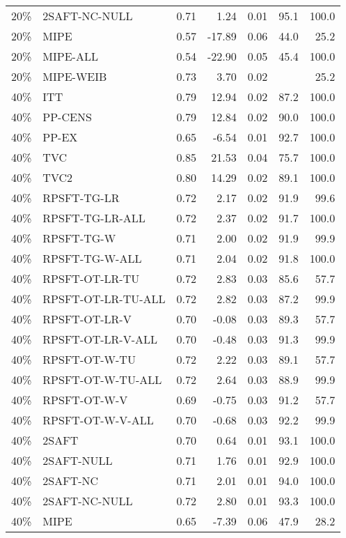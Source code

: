 \begin{table}[ht]
{\begin{tabular}{llrrrrr}
  20\% & 2SAFT-NC-NULL & 0.71 & 1.24 & 0.01 & 95.1 & 100.0 \\ 
  20\% & MIPE & 0.57 & -17.89 & 0.06 & 44.0 & 25.2 \\ 
  20\% & MIPE-ALL & 0.54 & -22.90 & 0.05 & 45.4 & 100.0 \\ 
  20\% & MIPE-WEIB & 0.73 & 3.70 & 0.02 &  & 25.2 \\ 
   \hline
40\% & ITT & 0.79 & 12.94 & 0.02 & 87.2 & 100.0 \\ 
  40\% & PP-CENS & 0.79 & 12.84 & 0.02 & 90.0 & 100.0 \\ 
  40\% & PP-EX & 0.65 & -6.54 & 0.01 & 92.7 & 100.0 \\ 
  40\% & TVC & 0.85 & 21.53 & 0.04 & 75.7 & 100.0 \\ 
  40\% & TVC2 & 0.80 & 14.29 & 0.02 & 89.1 & 100.0 \\ 
   \hline
40\% & RPSFT-TG-LR & 0.72 & 2.17 & 0.02 & 91.9 & 99.6 \\ 
  40\% & RPSFT-TG-LR-ALL & 0.72 & 2.37 & 0.02 & 91.7 & 100.0 \\ 
  40\% & RPSFT-TG-W & 0.71 & 2.00 & 0.02 & 91.9 & 99.9 \\ 
  40\% & RPSFT-TG-W-ALL & 0.71 & 2.04 & 0.02 & 91.8 & 100.0 \\ 
  40\% & RPSFT-OT-LR-TU & 0.72 & 2.83 & 0.03 & 85.6 & 57.7 \\ 
  40\% & RPSFT-OT-LR-TU-ALL & 0.72 & 2.82 & 0.03 & 87.2 & 99.9 \\ 
  40\% & RPSFT-OT-LR-V & 0.70 & -0.08 & 0.03 & 89.3 & 57.7 \\ 
  40\% & RPSFT-OT-LR-V-ALL & 0.70 & -0.48 & 0.03 & 91.3 & 99.9 \\ 
   \hline
40\% & RPSFT-OT-W-TU & 0.72 & 2.22 & 0.03 & 89.1 & 57.7 \\ 
  40\% & RPSFT-OT-W-TU-ALL & 0.72 & 2.64 & 0.03 & 88.9 & 99.9 \\ 
  40\% & RPSFT-OT-W-V & 0.69 & -0.75 & 0.03 & 91.2 & 57.7 \\ 
  40\% & RPSFT-OT-W-V-ALL & 0.70 & -0.68 & 0.03 & 92.2 & 99.9 \\ 
   \hline
40\% & 2SAFT & 0.70 & 0.64 & 0.01 & 93.1 & 100.0 \\ 
  40\% & 2SAFT-NULL & 0.71 & 1.76 & 0.01 & 92.9 & 100.0 \\ 
  40\% & 2SAFT-NC & 0.71 & 2.01 & 0.01 & 94.0 & 100.0 \\ 
  40\% & 2SAFT-NC-NULL & 0.72 & 2.80 & 0.01 & 93.3 & 100.0 \\ 
  40\% & MIPE & 0.65 & -7.39 & 0.06 & 47.9 & 28.2 \\ 

\end{tabular}}
\end{table}
